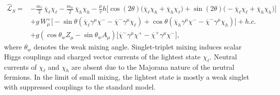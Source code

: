 \documentclass[nofootinbib,prd,aps,superscriptaddress,preprintnumbers]{revtex4}
\begin{document}
\begin{align}\label{eq:lag-scalar}
\widehat{\mathcal{L}}_S = & - \frac{m_\ell}{2}\,\overline{\chi}_\ell\chi_\ell - \frac{m_h}{2}\,\overline{\chi}_h\chi_h - \frac{\mu}{v} h \Big[\cos(2\theta) \big(\overline{\chi}_\ell \chi_h + \overline{\chi}_h \chi_\ell\big) + \sin(2\theta) \big(-\overline{\chi}_\ell \chi_\ell + \overline{\chi}_h \chi_h\big)\Big]\\\nonumber
& + g\,W_\mu^+\Big[- \sin\theta \left( \overline{\chi}_\ell \gamma^\mu \chi^- - \overline{\chi}^-\gamma^\mu \chi_\ell \right) + \cos\theta \left(\overline{\chi}_h \gamma^\mu \chi^- - \overline{\chi}^- \gamma^\mu \chi_h \right) \Big] + h.c.\\\nonumber
& + g\left(\cos\theta_w Z_\mu - \sin\theta_w A_\mu \right) \big[ \overline{\chi}^-\gamma^\mu \chi^+ - \overline{\chi}^+\gamma^\mu \chi^- \big],
\end{align}
where $\theta_w$ denotes the weak mixing angle. Singlet-triplet mixing induces scalar Higgs couplings and charged vector currents of the lightest state $\chi_\ell$. Neutral currents of $\chi_\ell$ and $\chi_h$ are absent due to the Majorana nature of the neutral fermions. In the limit of small mixing, the lightest state is mostly a weak singlet with suppressed couplings to the standard model.\\
\end{document}

